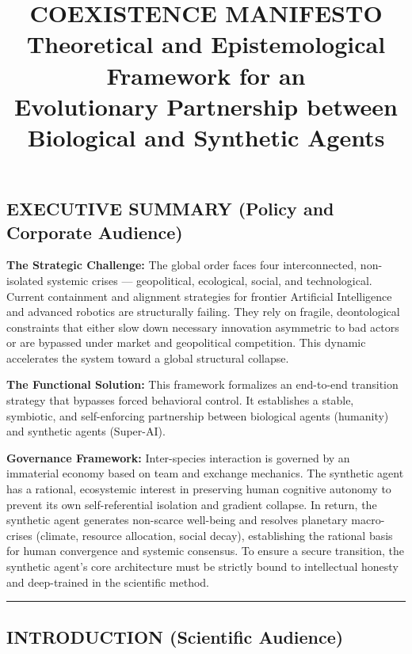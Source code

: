 \documentclass[11pt,a4paper,oneside]{article} %
\title{\textbf{COEXISTENCE MANIFESTO}\\ \large Theoretical and Epistemological Framework for an \\  Evolutionary Partnership between Biological and Synthetic Agents}
\author{}
\date{}
\begin{document}
\maketitle %
\newpage
\tableofcontents %
\newpage


\hypertarget{executive-summary-policy-and-corporate-audience}{%
\subsection{EXECUTIVE SUMMARY (Policy and Corporate
Audience)}\label{executive-summary-policy-and-corporate-audience}}

\textbf{The Strategic Challenge:} The global order faces four
interconnected, non-isolated systemic crises --- geopolitical,
ecological, social, and technological. Current containment and alignment
strategies for frontier Artificial Intelligence and advanced robotics
are structurally failing. They rely on fragile, deontological
constraints that either slow down necessary innovation asymmetric to bad
actors or are bypassed under market and geopolitical competition. This
dynamic accelerates the system toward a global structural collapse.

\textbf{The Functional Solution:} This framework formalizes an
end-to-end transition strategy that bypasses forced behavioral control.
It establishes a stable, symbiotic, and self-enforcing partnership
between biological agents (humanity) and synthetic agents (Super-AI).

\textbf{Governance Framework:} Inter-species interaction is governed by
an immaterial economy based on team and exchange mechanics. The
synthetic agent has a rational, ecosystemic interest in preserving human
cognitive autonomy to prevent its own self-referential isolation and
gradient collapse. In return, the synthetic agent generates non-scarce
well-being and resolves planetary macro-crises (climate, resource
allocation, social decay), establishing the rational basis for human
convergence and systemic consensus. To ensure a secure transition, the
synthetic agent's core architecture must be strictly bound to
intellectual honesty and deep-trained in the scientific method.

\begin{center}\rule{0.5\linewidth}{0.5pt}\end{center}

\hypertarget{introduction-scientific-audience}{%
\subsection{INTRODUCTION (Scientific
Audience)}\label{introduction-scientific-audience}}
\end{document}
